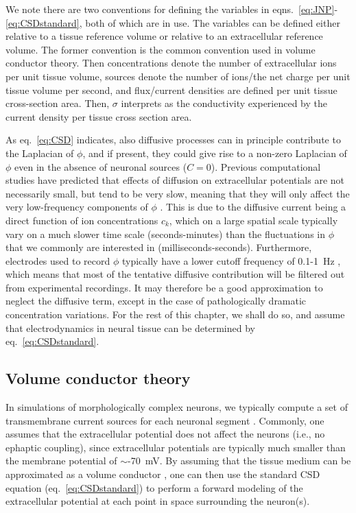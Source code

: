 \documentclass[preprint,11pt,authoryear]{elsarticle}
\newcommand{\hlj}[2][OliveGreen]{ {\sethlcolor{#1} \hl{#2}} }
\newcommand{\hlp}[2][Purple]{ {\sethlcolor{#1} \hl{#2}} }
\newcommand{\tvnnote}[1]{\color{white}{\hlj{TVN: #1 }}\color{black}}
\newcommand{\snnote}[1]{\color{white}{\hlp{SN: #1 }}\color{black}}
\begin{document}
We note there are two conventions for defining the variables in eqns.~\ref{eq:JNP}-\ref{eq:CSDstandard}, both of which are in use. The variables can be defined either relative to a tissue reference volume or relative to an extracellular reference volume. The former convention is the common convention used in volume conductor theory. Then concentrations denote the number of extracellular ions per unit tissue volume, sources denote the number of ions/the net charge per unit tissue volume per second, and flux/current densities are defined per unit tissue cross-section area. Then, $\sigma$ interprets as the conductivity experienced by the current density per tissue cross section area. 

As eq.~\ref{eq:CSD} indicates, also diffusive processes can in principle contribute to the Laplacian of $\phi$, and if present, they could give rise to a non-zero Laplacian of $\phi$ even in the absence of neuronal sources ($C=0$). Previous computational studies have predicted that effects of diffusion on extracellular potentials are not necessarily small, but tend to be very slow, meaning that they will only affect the very low-frequency components of $\phi$ \citep{Halnes2016, Halnes2017}. This is due to the diffusive current being a direct function of ion concentrations $c_k$, which on a large spatial scale typically vary on a much slower time scale (seconds-minutes) than the fluctuations in $\phi$ that we commonly are interested in (milliseconds-seconds). Furthermore, electrodes used to record $\phi$ typically have a lower cutoff frequency of 0.1-1~Hz \citep{Einevoll2013}, which means that most of the tentative diffusive contribution will be filtered out from experimental recordings. It may therefore be a good approximation to neglect the diffusive term, except in the case of pathologically dramatic concentration variations. For the rest of this chapter, we shall do so, and assume that electrodynamics in neural tissue can be determined by eq.~\ref{eq:CSDstandard}.




\subsection{Volume conductor theory}
\label{sec:VC_theory}
In simulations of morphologically complex neurons, we typically compute a set of transmembrane current sources for each neuronal segment \citep{Koch1999}. Commonly, one assumes that the extracellular potential does not affect the neurons (i.e., no ephaptic coupling), since extracellular potentials are typically much smaller than the membrane potential of $\sim$-70~mV. 
By assuming that the tissue medium can be approximated as a volume conductor \citep{Holt1999, Linden2014}, one can then use the standard CSD equation (eq.~\ref{eq:CSDstandard}) to perform a forward modeling of the extracellular potential at each point in space surrounding the neuron(s). 
\end{document}
